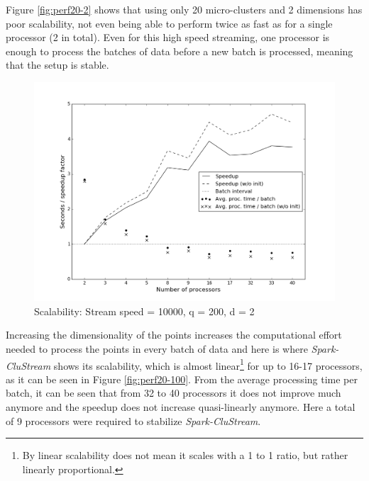 \documentclass{llncs}
\begin{document}
Figure \ref{fig:perf20-2} shows that using only 20 micro-clusters and 2 dimensions has poor scalability, not even being able to perform twice as fast as for a single processor (2 in total). Even for this high speed streaming, one processor is enough to process the batches of data before a new batch is processed, meaning that the setup is stable.

\begin{figure}[h!]
 \centering
 \includegraphics[scale=0.42]{./styles/perf200-2.png}
 \caption{Scalability: Stream speed = 10000, q = 200, d = 2}
 \label{fig:perf200-2}
\end{figure}

Increasing the dimensionality of the points increases the computational effort needed to process the points in every batch of data and here is where \textit{Spark-CluStream} shows its scalability, which is almost linear\footnote{By linear scalability does not mean it scales with a 1 to 1 ratio, but rather linearly proportional.} for up to 16-17 processors, as it can be seen in Figure \ref{fig:perf20-100}.  From the average processing time per batch, it can be seen that from 32 to 40 processors it does not improve much anymore and the speedup does not increase quasi-linearly anymore. Here a total of 9 processors were required to stabilize \textit{Spark-CluStream}. 
\end{document}
